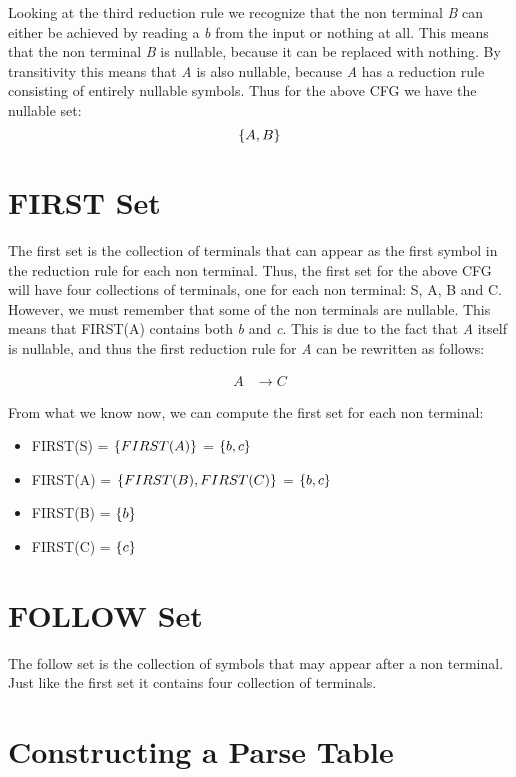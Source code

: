 Looking at the third reduction rule we recognize that the non terminal \textit{B} can either be achieved by reading a \textit{b} from the input or nothing at all. This means that the non terminal \textit{B} is nullable, because it can be replaced with nothing. By transitivity this means that \textit{A} is also nullable, because \textit{A} has a reduction rule consisting of entirely nullable symbols. Thus for the above CFG we have the nullable set:
\[\left\{A, B\right\}\]

\section{FIRST Set}

The first set is the collection of terminals that can appear as the first symbol in the reduction rule for each non terminal. Thus, the first set for the above CFG will have four collections of terminals, one for each non terminal: S, A, B and C. However, we must remember that some of the non terminals are nullable. This means that FIRST(A) contains both \textit{b} and \textit{c}. This is due to the fact that \textit{A} itself is nullable, and thus the first reduction rule for \textit{A} can be rewritten as follows:


\begin{equation*}
  \begin{split}
      A &\rightarrow C
  \end{split}
\end{equation*}

From what we know now, we can compute the first set for each non terminal:
\begin{itemize}
  \item FIRST(S) = $\left\{FIRST(A)\right\}$ = $\left\{b, c\right\}$
  \item FIRST(A) = $\left\{FIRST(B), FIRST(C)\right\}$ = $\left\{b, c\right\}$
  \item FIRST(B) = $\left\{b\right\}$
  \item FIRST(C) = $\left\{c\right\}$
\end{itemize}

\section{FOLLOW Set}

The follow set is the collection of symbols that may appear after a non terminal. Just like the first set it contains four collection of terminals.

\section{Constructing a Parse Table}

